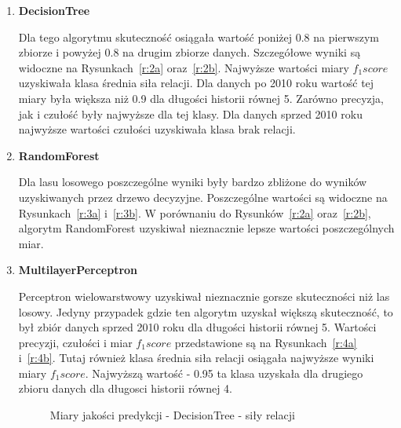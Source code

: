 \documentclass[polish,12pt]{aghthesis}
\begin{document}
\begin{enumerate}
\begin{figure}[ht]
\end{figure}
    \FloatBarrier

    \item \textbf{DecisionTree}
    
Dla tego algorytmu skuteczność osiągała wartość poniżej 0.8 na pierwszym zbiorze i powyżej 0.8 na drugim zbiorze danych. Szczegółowe wyniki są widoczne na Rysunkach~\ref{r:2a} oraz~\ref{r:2b}. Najwyższe wartości miary \textit{$f_1 score$} uzyskiwała klasa średnia siła relacji. Dla danych po 2010 roku wartość tej miary była większa niż 0.9 dla długości historii równej 5. Zarówno precyzja, jak i czułość były najwyższe dla tej klasy. Dla danych sprzed 2010 roku najwyższe wartości czułości uzyskiwała klasa brak relacji.
    
    \item \textbf{RandomForest}
    
Dla lasu losowego poszczególne wyniki były bardzo zbliżone do wyników uzyskiwanych przez drzewo decyzyjne. Poszczególne wartości są widoczne na Rysunkach~\ref{r:3a} i~\ref{r:3b}. W porównaniu do Rysunków~\ref{r:2a} oraz~\ref{r:2b}, algorytm RandomForest uzyskiwał nieznacznie lepsze wartości poszczególnych miar.
    
    \item \textbf{MultilayerPerceptron}    
    
Perceptron wielowarstwowy uzyskiwał nieznacznie gorsze skuteczności niż las losowy. Jedyny przypadek gdzie ten algorytm uzyskał większą skuteczność, to był zbiór danych sprzed 2010 roku dla długości historii równej 5. Wartości precyzji, czułości i miar \textit{$f_1 score$} przedstawione są na Rysunkach~\ref{r:4a} i~\ref{r:4b}. Tutaj również klasa średnia siła relacji osiągała najwyższe wyniki miary \textit{$f_1 score$}. Najwyższą wartość - 0.95 ta klasa uzyskała dla drugiego zbioru danych dla długosci historii równej 4.
    
            \begin{figure}[ht] 
    \centering
    \hfill%
    \label{r:r3}
    \caption{Miary jakości predykcji - DecisionTree - siły relacji}
    
\end{figure}
    \FloatBarrier
    


\end{enumerate}
\end{document}
